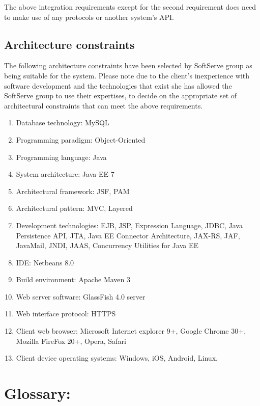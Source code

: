 \documentclass[12pt]{article}
\begin{document}
The above integration requirements except for the second requirement does need to make use of any protocols or another system's API.

\vspace{0.2in}

\subsection{Architecture constraints}
\vspace{0.2in}

The following architecture constraints have been selected by SoftServe group as being suitable for the system. Please note due to the client's inexperience with software development and the technologies that exist she has allowed the SoftServe group to use their expertises, to decide on the appropriate set of architectural constraints that can meet the above requirements.
\begin{enumerate}
\item Database technology: MySQL
\item Programming paradigm: Object-Oriented
\item Programming language: Java
\item System architecture: Java-EE 7
\item Architectural framework: JSF, PAM
\item Architectural pattern: MVC, Layered
\item Development technologies: EJB, JSP, Expression Language, JDBC, Java Persistence API, JTA, Java EE Connector Architecture, JAX-RS, JAF, JavaMail, JNDI, JAAS, Concurrency Utilities for Java EE
\item IDE: Netbeans 8.0
\item Build environment: Apache Maven 3
\item Web server software: GlassFish 4.0 server
\item Web interface protocol: HTTPS
\item Client web browser: Microsoft Internet explorer 9+, Google Chrome 30+, Mozilla FireFox 20+, Opera, Safari
\item Client device operating systems: Windows, iOS, Android, Linux. 
\end{enumerate}
\vspace{0.5in}

\newpage
\section{Glossary:}
\vspace{0.2in}
\end{document}

